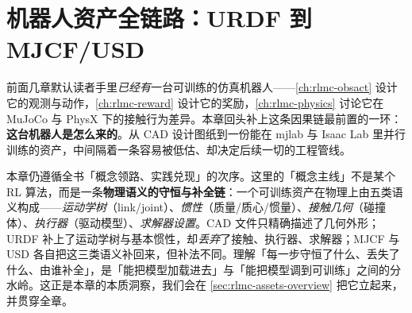 \chapter{机器人资产全链路：URDF 到 MJCF/USD}\label{ch:rlmc-assets}


前面几章默认读者手里\emph{已经有}一台可训练的仿真机器人——\cref{ch:rlmc-obsact} 设计它的观测与动作，\cref{ch:rlmc-reward} 设计它的奖励，\cref{ch:rlmc-physics} 讨论它在 MuJoCo 与 PhysX 下的接触行为差异。本章回头补上这条因果链最前置的一环：\textbf{这台机器人是怎么来的}。从 CAD 设计图纸到一份能在 mjlab 与 Isaac Lab 里并行训练的资产，中间隔着一条容易被低估、却决定后续一切的工程管线。

本章仍遵循全书「概念领路、实践兑现」的次序。这里的「概念主线」不是某个 RL 算法，而是一条\textbf{物理语义的守恒与补全链}：一个可训练资产在物理上由五类语义构成——\emph{运动学树}（link/joint）、\emph{惯性}（质量/质心/惯量）、\emph{接触几何}（碰撞体）、\emph{执行器}（驱动模型）、\emph{求解器设置}。CAD 文件只精确描述了几何外形；URDF 补上了运动学树与基本惯性，却\emph{丢弃}了接触、执行器、求解器；MJCF 与 USD 各自把这三类语义补回来，但补法不同。理解「每一步守恒了什么、丢失了什么、由谁补全」，是「能把模型加载进去」与「能把模型调到可训练」之间的分水岭。这正是本章的本质洞察，我们会在 \cref{sec:rlmc-assets-overview} 把它立起来，并贯穿全章。

